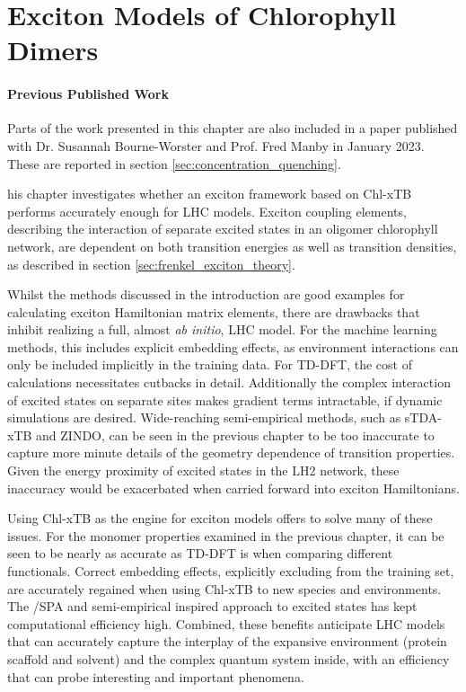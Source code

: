 %
%
\let\textcircled=\pgftextcircled
\chapter{Exciton Models of Chlorophyll Dimers}
\label{chap:excitons}

\subsubsection*{Previous Published Work}
Parts of the work presented in this chapter are also included in a paper published 
with Dr. Susannah Bourne-Worster and Prof. Fred Manby in January 2023. These are 
reported in section \ref{sec:concentration_quenching}.

his chapter investigates whether an exciton framework based on Chl-xTB
performs accurately enough for LHC models. Exciton coupling elements, describing the
interaction of separate excited states in an oligomer chlorophyll network, are dependent
on both transition energies as well as transition densities, as described in section
\ref{sec:frenkel_exciton_theory}.

Whilst the methods discussed in the introduction are good examples for calculating exciton
Hamiltonian matrix elements, there are drawbacks that inhibit realizing a full,
almost \emph{ab initio}, LHC model. For the machine learning methods, this includes
explicit embedding effects, as environment interactions can only be included implicitly
in the training data. For TD-DFT, the cost of calculations necessitates cutbacks
in detail. Additionally the complex interaction of excited states on separate sites
makes gradient terms intractable, \cite{Stross2016} if dynamic simulations are desired.
Wide-reaching semi-empirical methods, such as sTDA-xTB and ZINDO, can be seen in
the previous chapter to be too inaccurate to capture more minute details of the 
geometry dependence of \Qy transition properties. Given the energy proximity of 
excited states in the LH2 network, these inaccuracy would be exacerbated when carried
forward into exciton Hamiltonians.

Using Chl-xTB as the engine for exciton models offers to solve many of these issues.
For the monomer properties examined in the previous chapter, it can be seen to be
nearly as accurate as TD-DFT is when comparing different functionals. Correct embedding 
effects, explicitly excluding from the training set, are accurately regained
when using Chl-xTB to new species and environments. The \dscf/SPA and semi-empirical 
inspired approach to excited states has kept computational efficiency high. Combined,
these benefits anticipate LHC models that can accurately capture the interplay
of the expansive environment (protein scaffold and solvent) and the complex quantum
system inside, with an efficiency that can probe interesting and important phenomena.

